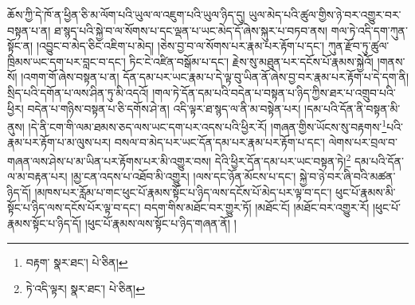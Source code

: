 ཆོས་ཀྱི་དེ་ཁོ་ན་ཕྱིན་ཅི་མ་ལོག་པའི་ཡུལ་ལ་འཇུག་པའི་ཡུལ་ཉིད་དུ། ཡུལ་མེད་པའི་ཚུལ་གྱིས་ཉེ་བར་འགྱུར་བར་བསྟན་པ་ན། ཐ་སྙད་པའི་སྐྱེ་བ་ལ་སོགས་པ་དང་ལྡན་པ་ཡང་མེད་དོ་ཞེས་སྐུར་པ་བཏབ་ནས། གལ་ཏེ་འདི་དག་ཀུན་སྟོང་ན། །འབྱུང་བ་མེད་ཅིང་འཇིག་པ་མེད། །ཅེས་བྱ་བ་ལ་སོགས་པར་རྣམ་པར་རྟོག་པ་དང་། ཀུན་རྫོབ་ཏུ་ཚུལ་ཁྲིམས་ཡང་དག་པར་བླང་བ་དང་། ཏིང་ངེ་འཛིན་བསྒོམ་པ་དང་། རྗེས་སུ་མཐུན་པར་དངོས་པོ་རྣམས་སྐྱེའོ། །གནས་སོ། །འགག་གོ་ཞེས་བསྟན་པ་ན། དོན་དམ་པར་ཡང་རྣམ་པ་དེ་ལྟ་བུ་ཡིན་ནོ་ཞེས་བྱ་བར་རྣམ་པར་རྟོག་པ་དེ་དག་ནི། སྲིད་པའི་དགོན་པ་ལས་ཤིན་ཏུ་མི་འདའོ། །གལ་ཏེ་དོན་དམ་པའི་བདེན་པ་བསྟན་པ་ཉིད་ཀྱིས་ཐར་པ་འགྲུབ་པའི་ཕྱིར། བདེན་པ་གཉིས་བསྟན་པ་ཅི་དགོས་ཤེ་ན། འདི་ལྟར་ཐ་སྙད་ལ་ནི་མ་བསྟེན་པར། །དམ་པའི་དོན་ནི་བསྟན་མི་ནུས། །དེ་ནི་ངག་གི་ལམ་ཐམས་ཅད་ལས་ཡང་དག་པར་འདས་པའི་ཕྱིར་རོ། །གཞན་གྱིས་ཡོངས་སུ་བརྟགས་\footnote{བརྟག་  སྣར་ཐང་།  པེ་ཅིན། }པའི་རྣམ་པར་རྟོག་པ་མ་ལུས་པར། བསལ་བ་མེད་པར་ཡང་དོན་དམ་པར་རྣམ་པར་རྟོག་པ་དང་། ལེགས་པར་བྲལ་བ་གཞན་ལས་ཤེས་པ་མ་ཡིན་པར་རྟོགས་པར་མི་འགྱུར་བས། དེའི་ཕྱིར་དོན་དམ་པར་ཡང་བསྟན་ཏེ།\footnote{ཏེ་འདི་ལྟར།  སྣར་ཐང་།  པེ་ཅིན། } དམ་པའི་དོན་ལ་མ་བརྟན་པར། །མྱ་ངན་འདས་པ་འཐོབ་མི་འགྱུར། །ལས་དང་ཉོན་མོངས་པ་དང་། སྐྱེ་བ་ཉེ་བར་ཞི་བའི་མཚན་ཉིད་དོ། །མཁས་པར་རློམ་པ་གང་ཕུང་པོ་རྣམས་སྟོང་པ་ཉིད་ལས་དངོས་པོ་མེད་པར་ལྟ་བ་དང་། ཕུང་པོ་རྣམས་མི་སྟོང་པ་ཉིད་ལས་དངོས་པོར་ལྟ་བ་དང་། བདག་གིས་མཐོང་བར་གྱུར་ཏོ། །མཐོང་ངོ། །མཐོང་བར་འགྱུར་རོ། །ཕུང་པོ་རྣམས་སྟོང་པ་ཉིད་དོ། །ཕུང་པོ་རྣམས་ལས་སྟོང་པ་ཉིད་གཞན་ནོ། །
